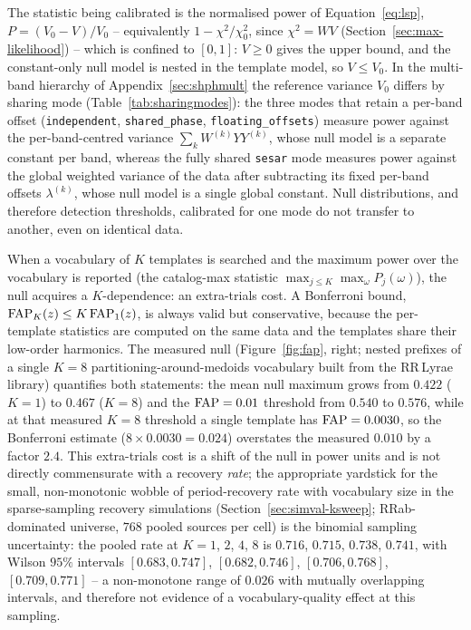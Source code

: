 \documentclass[apj]{emulateapj}
\newcommand{\lk}[1][k]{\lambda^{(#1)}}
\newcommand{\Wtk}[1][k]{W^{(#1)}}
\begin{document}
The statistic being calibrated is the normalised power of
Equation~\ref{eq:lsp}, $P = (V_0 - V)/V_0$ -- equivalently
$1 - \chi^2/\chi^2_0$, since $\chi^2 = W V$ (Section~\ref{sec:max-likelihood})
-- which is confined to $[0,1]$: $V \geq 0$ gives the upper bound, and the
constant-only null model is nested in the template model, so $V \leq V_0$.
In the multi-band hierarchy of Appendix~\ref{sec:shphmult} the reference
variance $V_0$ differs by sharing mode (Table~\ref{tab:sharingmodes}): the three modes that
retain a per-band offset (\texttt{independent}, \texttt{shared\_phase},
\texttt{floating\_offsets}) measure power against the per-band-centred
variance $\sum_k \Wtk YY^{(k)}$, whose null model is a separate constant per
band, whereas the fully shared \texttt{sesar} mode measures power against the
global weighted variance of the data after subtracting its fixed per-band
offsets $\lk$, whose null model is a single global constant.  Null
distributions, and therefore detection thresholds, calibrated for one mode
do not transfer to another, even on identical data.

When a vocabulary of $K$ templates is searched and the maximum power over the
vocabulary is reported (the catalog-max statistic
$\max_{j \leq K}\max_\omega P_j(\omega)$), the null acquires a $K$-dependence:
an extra-trials cost.  A Bonferroni bound,
${\rm FAP}_K(z) \leq K\,{\rm FAP}_1(z)$, is always valid but conservative,
because the per-template statistics are computed on the same data and the
templates share their low-order harmonics.  The measured null
(Figure~\ref{fig:fap}, right; nested prefixes of a single $K{=}8$
partitioning-around-medoids vocabulary built from the \citealt{Sesar_etal_2010}
RR\,Lyrae library) quantifies both statements: the mean null maximum grows
from $0.422$ ($K{=}1$) to $0.467$ ($K{=}8$) and the ${\rm FAP}=0.01$ threshold
from $0.540$ to $0.576$, while at that measured $K{=}8$ threshold a single
template has ${\rm FAP} = 0.0030$, so the Bonferroni estimate
($8 \times 0.0030 = 0.024$) overstates the measured $0.010$ by a factor
$2.4$.  This extra-trials cost is a shift of the null in power units and
is not directly commensurate with a recovery \emph{rate}; the appropriate
yardstick for the small, non-monotonic wobble of period-recovery rate with
vocabulary size in the sparse-sampling recovery simulations
(Section~\ref{sec:simval-ksweep}; RRab-dominated
universe, $768$ pooled sources per cell) is the binomial sampling
uncertainty: the pooled rate at
$K = 1$, $2$, $4$, $8$ is $0.716$, $0.715$, $0.738$, $0.741$, with Wilson
$95\%$ intervals $[0.683, 0.747]$, $[0.682, 0.746]$, $[0.706, 0.768]$,
$[0.709, 0.771]$ -- a non-monotone range of $0.026$ with mutually
overlapping intervals, and therefore not
evidence of a vocabulary-quality effect at this sampling.
\end{document}
